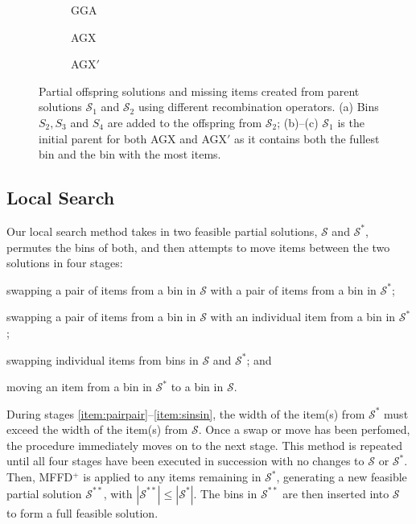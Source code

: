 \documentclass[authoryear]{elsarticle}
\begin{document}
\begin{figure}[H]	
	\centering
	\begin{subfigure}[h]{0.3\textwidth}
		
		\caption{GGA}
		\label{fig:gga}
	\end{subfigure} \hspace{5mm}
	\begin{subfigure}[h]{0.3\textwidth}
		
		\caption{AGX}
		\label{fig:agx}
	\end{subfigure} \hspace{5mm}
	\begin{subfigure}[h]{0.3\textwidth}
		
		\caption{AGX$'$}
		\label{fig:agxdash}
	\end{subfigure}
	\caption{Partial offspring solutions and missing items created from parent solutions $\mathcal{S}_1$ and $\mathcal{S}_2$ using different recombination operators. (a) Bins $S_2, S_3$ and $S_4$ are added to the offspring from $\mathcal{S}_2$; (b)--(c) $\mathcal{S}_1$ is the initial parent for both AGX and AGX$'$ as it contains both the fullest bin and the bin with the most items.}
	\label{fig:recomb}
\end{figure}

\subsection{Local Search}
\label{sub:localsearch}
\noindent Our local search method takes in two feasible partial solutions, $\mathcal{S}$ and $\mathcal{S}^*$, permutes the bins of both, and then attempts to move items between the two solutions in four stages: 
\begin{enumerate*}[label={(\roman*)}]
	\item swapping a pair of items from a bin in $\mathcal{S}$ with a pair of items from a bin in $\mathcal{S}^*$;\label{item:pairpair}
	\item swapping a pair of items from a bin in $\mathcal{S}$ with an individual item from a bin in $\mathcal{S}^*$;\label{item:pairsin}
	\item swapping individual items from bins in $\mathcal{S}$ and $\mathcal{S}^*$;\label{item:sinsin} and
	\item moving an item from a bin in $\mathcal{S}^*$ to a bin in $\mathcal{S}$.\label{item:movesin}
\end{enumerate*} 
During stages \ref{item:pairpair}--\ref{item:sinsin}, the width of the item(s) from $\mathcal{S}^*$ must exceed the width of the item(s) from $\mathcal{S}$. Once a swap or move has been perfomed, the procedure immediately moves on to the next stage. This method is repeated until all four stages have been executed in succession with no changes to $\mathcal{S}$ or $\mathcal{S}^*$. Then, MFFD$^+$ is applied to any items remaining in $\mathcal{S}^*$, generating a new feasible partial solution $\mathcal{S}^{**}$, with $|\mathcal{S}^{**}| \leq |\mathcal{S}^*|$. The bins in $\mathcal{S}^{**}$ are then inserted into $\mathcal{S}$ to form a full feasible solution.
\end{document}
